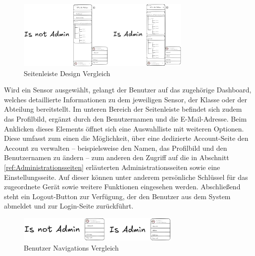 \begin{inhalt}
\begin{figure}[!htb] 
\centering 
\includegraphics[width=0.75\textwidth]{files/Thomas/pics/Design-Grundlagen/Frontend/Sidebar/sidebar-adminvsnotadmin.png} 
\caption[Seitenleiste Design Vergleich]{Seitenleiste Design Vergleich} 
\label{fig:gehaeuse_internet_bild} 
\end{figure}


Wird ein Sensor ausgewählt, gelangt der Benutzer auf das zugehörige Dashboard, welches detaillierte Informationen zu dem jeweiligen Sensor, der Klasse oder der Abteilung bereitstellt. Im unteren Bereich der Seitenleiste befindet sich zudem das Profilbild, ergänzt durch den Benutzernamen und die E-Mail-Adresse. Beim Anklicken dieses Elements öffnet sich eine Auswahlliste mit weiteren Optionen. Diese umfasst zum einen die Möglichkeit, über eine dedizierte Account-Seite den Account zu verwalten – beispielsweise den Namen, das Profilbild und den Benutzernamen zu ändern – zum anderen den Zugriff auf die in Abschnitt \ref{ref:Administrationsseiten} erläuterten Administrationsseiten sowie eine Einstellungsseite. Auf dieser können unter anderem persönliche Schlüssel für das zugeordnete Gerät sowie weitere Funktionen eingesehen werden. Abschließend steht ein Logout-Button zur Verfügung, der den Benutzer aus dem System abmeldet und zur Login-Seite zurückführt.

\begin{figure}[!htb] 
\centering 
\includegraphics[width=0.7\textwidth]{files/Thomas/pics/Design-Grundlagen/Frontend/Sidebar/sidebar-nav-user-adminvsnotadmin.png} 
\caption[Benutzer Navigations Vergleich]{Benutzer Navigations Vergleich} 
\label{fig:gehaeuse_internet_bild} 
\end{figure}

\newpage


































\end{inhalt}
